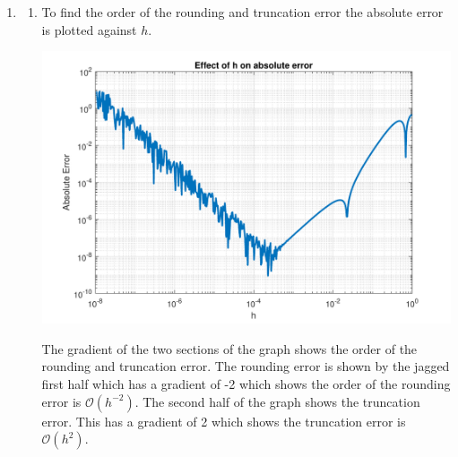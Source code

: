 \documentclass[a4paper,11pt]{article}
\begin{document}
\begin{enumerate}
	
	\item \begin{enumerate}
		\item To find the order of the rounding and truncation error the 
		absolute error is plotted against $h$.
		\begin{center}
			\includegraphics[scale=0.7]{images/Q2bi.pdf}
		\end{center}
		The gradient of the two sections of the graph shows the order of the 
		rounding and truncation error. The rounding error is shown by the 
		jagged first half which has a gradient of -2 which shows the order of 
		the rounding error is $\mathcal{O}(h^{-2})$. The second half of the 
		graph shows the truncation error. This has a gradient of 2 which 
		shows the truncation error is $\mathcal{O}(h^{2})$.
		

\end{enumerate}
\end{enumerate}
\end{document}
